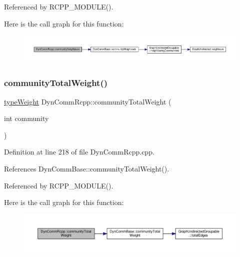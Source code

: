 Referenced by R\+C\+P\+P\+\_\+\+M\+O\+D\+U\+L\+E().

Here is the call graph for this function\+:
\nopagebreak
\begin{figure}[H]
\begin{center}
\leavevmode
\includegraphics[width=350pt]{classDynCommRcpp_ad23168e5fa7cf85d5508c646f3e39b9b_cgraph}
\end{center}
\end{figure}
\mbox{\label{classDynCommRcpp_a687e7be3ae84f1a80a3648435bd473a3}} 
\subsubsection{\texorpdfstring{community\+Total\+Weight()}{communityTotalWeight()}}
{\footnotesize\ttfamily \hyperlink{edge_8h_a2e7ea3be891ac8b52f749ec73fee6dd2}{type\+Weight} Dyn\+Comm\+Rcpp\+::community\+Total\+Weight (\begin{DoxyParamCaption}\item[{int}]{community }\end{DoxyParamCaption})\hspace{0.3cm}{\ttfamily [inline]}}



Definition at line 218 of file Dyn\+Comm\+Rcpp.\+cpp.



References Dyn\+Comm\+Base\+::community\+Total\+Weight().



Referenced by R\+C\+P\+P\+\_\+\+M\+O\+D\+U\+L\+E().

Here is the call graph for this function\+:
\nopagebreak
\begin{figure}[H]
\begin{center}
\leavevmode
\includegraphics[width=350pt]{classDynCommRcpp_a687e7be3ae84f1a80a3648435bd473a3_cgraph}
\end{center}
\end{figure}
\mbox{\label{classDynCommRcpp_ab856335d737d2292df6f86e9cf199d58}} 
